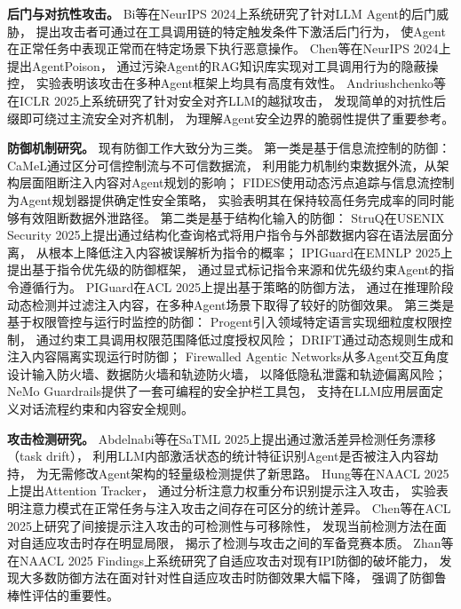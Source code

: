 \textbf{后门与对抗性攻击。}
Bi等\cite{bi2024backdoor}在NeurIPS 2024上系统研究了针对LLM Agent的后门威胁，
提出攻击者可通过在工具调用链的特定触发条件下激活后门行为，
使Agent在正常任务中表现正常而在特定场景下执行恶意操作。
Chen等\cite{chen2024agentpoison}在NeurIPS 2024上提出AgentPoison，
通过污染Agent的RAG知识库实现对工具调用行为的隐蔽操控，
实验表明该攻击在多种Agent框架上均具有高度有效性。
Andriushchenko等\cite{andriushchenko2025jailbreaking}在ICLR 2025上系统研究了针对安全对齐LLM的越狱攻击，
发现简单的对抗性后缀即可绕过主流安全对齐机制，
为理解Agent安全边界的脆弱性提供了重要参考。

\textbf{防御机制研究。}
现有防御工作大致分为三类。
第一类是基于信息流控制的防御：
CaMeL\cite{debenedetti2025camel}通过区分可信控制流与不可信数据流，
利用能力机制约束数据外流，从架构层面阻断注入内容对Agent规划的影响；
FIDES\cite{costa2025fides}使用动态污点追踪与信息流控制为Agent规划器提供确定性安全策略，
实验表明其在保持较高任务完成率的同时能够有效阻断数据外泄路径。
第二类是基于结构化输入的防御：
StruQ\cite{chen2025struq}在USENIX Security 2025上提出通过结构化查询格式将用户指令与外部数据内容在语法层面分离，
从根本上降低注入内容被误解析为指令的概率；
IPIGuard\cite{an2025ipiguard}在EMNLP 2025上提出基于指令优先级的防御框架，
通过显式标记指令来源和优先级约束Agent的指令遵循行为。
PIGuard\cite{li2025piguard}在ACL 2025上提出基于策略的防御方法，
通过在推理阶段动态检测并过滤注入内容，在多种Agent场景下取得了较好的防御效果。
第三类是基于权限管控与运行时监控的防御：
Progent\cite{shi2025progent}引入领域特定语言实现细粒度权限控制，
通过约束工具调用权限范围降低过度授权风险；
DRIFT\cite{li2025drift}通过动态规则生成和注入内容隔离实现运行时防御；
Firewalled Agentic Networks\cite{abdelnabi2025firewalls}从多Agent交互角度设计输入防火墙、数据防火墙和轨迹防火墙，
以降低隐私泄露和轨迹偏离风险；
NeMo Guardrails\cite{rebedea2023nemo}提供了一套可编程的安全护栏工具包，
支持在LLM应用层面定义对话流程约束和内容安全规则。

\textbf{攻击检测研究。}
Abdelnabi等\cite{abdelnabi2025drift}在SaTML 2025上提出通过激活差异检测任务漂移（task drift），
利用LLM内部激活状态的统计特征识别Agent是否被注入内容劫持，
为无需修改Agent架构的轻量级检测提供了新思路。
Hung等\cite{hung2025attention}在NAACL 2025上提出Attention Tracker，
通过分析注意力权重分布识别提示注入攻击，
实验表明注意力模式在正常任务与注入攻击之间存在可区分的统计差异。
Chen等\cite{chen2025can}在ACL 2025上研究了间接提示注入攻击的可检测性与可移除性，
发现当前检测方法在面对自适应攻击时存在明显局限，
揭示了检测与攻击之间的军备竞赛本质。
Zhan等\cite{zhan2025adaptive}在NAACL 2025 Findings上系统研究了自适应攻击对现有IPI防御的破坏能力，
发现大多数防御方法在面对针对性自适应攻击时防御效果大幅下降，
强调了防御鲁棒性评估的重要性。

